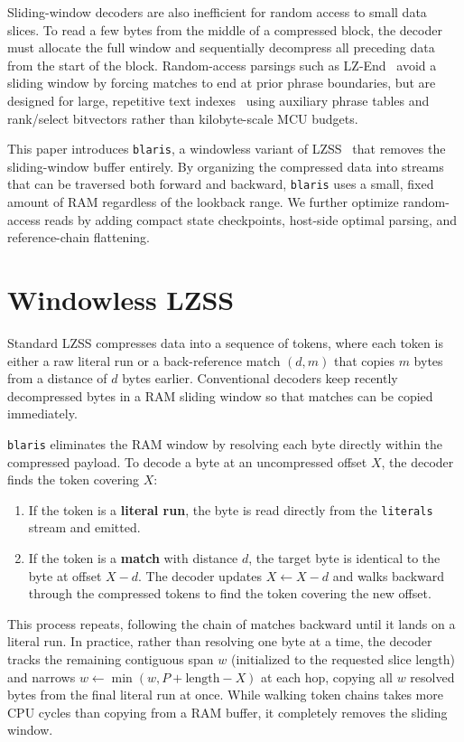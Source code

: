 \documentclass[10pt,twocolumn]{article}
\newcommand{\code}[1]{\texttt{#1}}
\begin{document}
Sliding-window decoders are also inefficient for random access to small data
slices. To read a few bytes from the middle of a compressed block, the decoder
must allocate the full window and sequentially decompress all preceding data
from the start of the block. Random-access parsings such as
LZ-End~\cite{lzend,kempa2022} avoid a sliding window by forcing matches to end
at prior phrase boundaries, but are designed for large, repetitive text
indexes~\cite{navarro2021} using auxiliary phrase tables and rank/select
bitvectors rather than kilobyte-scale MCU budgets.

This paper introduces \code{blaris}, a windowless variant of LZSS~\cite{lzss}
that removes the sliding-window buffer entirely. By organizing the compressed
data into streams that can be traversed both forward and backward, \code{blaris}
uses a small, fixed amount of RAM regardless of the lookback range. We further
optimize random-access reads by adding compact state checkpoints, host-side
optimal parsing, and reference-chain flattening.

\section{Windowless LZSS}
Standard LZSS compresses data into a sequence of tokens, where each token is
either a raw literal run or a back-reference match $(d, m)$ that copies $m$
bytes from a distance of $d$ bytes earlier. Conventional decoders keep recently
decompressed bytes in a RAM sliding window so that matches can be copied
immediately.

\code{blaris} eliminates the RAM window by resolving each byte directly within
the compressed payload. To decode a byte at an uncompressed offset $X$, the
decoder finds the token covering $X$:
\begin{enumerate}
    \item If the token is a \textbf{literal run}, the byte is read directly
        from the \code{literals} stream and emitted.
    \item If the token is a \textbf{match} with distance $d$, the target byte is
        identical to the byte at offset $X - d$. The decoder updates $X
        \leftarrow X - d$ and walks backward through the compressed tokens to
        find the token covering the new offset.
\end{enumerate}
This process repeats, following the chain of matches backward until it lands on
a literal run. In practice, rather than resolving one byte at a time, the
decoder tracks the remaining contiguous span $w$ (initialized to the requested
slice length) and narrows $w \leftarrow \min(w, P + \text{length} - X)$ at each
hop, copying all $w$ resolved bytes from the final literal run at once. While
walking token chains takes more CPU cycles than copying from a RAM buffer, it
completely removes the sliding window.
\end{document}
